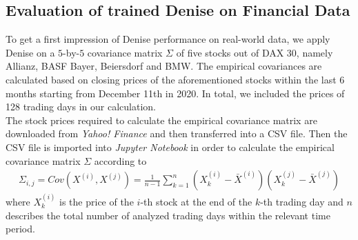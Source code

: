 \subsection{Evaluation of trained Denise on Financial Data}
To get a first impression of Denise performance on real-world data, we apply Denise on a $5$-by-$5$ covariance matrix $\Sigma$ of five stocks out of DAX 30, namely Allianz, BASF Bayer, Beiersdorf and BMW. The empirical covariances are calculated based on closing prices of the aforementioned stocks within the last 6 months starting from December 11th in 2020. In total, we included the prices of 128 trading days in our calculation.\\

The stock prices required to calculate the empirical covariance matrix are downloaded from \textit{Yahoo! Finance} and then transferred into a CSV file. Then the CSV file is imported into \textit{Jupyter Notebook} in order to calculate the empirical covariance matrix $\Sigma$ according to 
\begin{align}
	\Sigma_{i,j} = Cov(X^{(i)},X^{(j)}) = \frac{1}{n-1} \sum_{k=1}^{n} (X_{k}^{(i)} - \bar{X}^{(i)}) (X_{k}^{(j)} - \bar{X}^{(j)})
\end{align}
where $X_{k}^{(i)}$ is the price of the $i$-th stock at the end of the $k$-th trading day and $n$ describes the total number of analyzed trading days within the relevant time period. 

